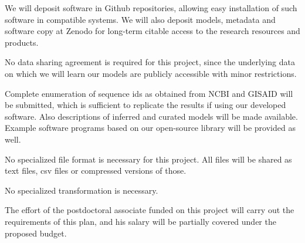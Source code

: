 \documentclass[onecolumn, compsoc,12pt]{IEEEtran}
\begin{document}
              We will deposit software in Github repositories, allowing easy installation of such software in compatible systems. We will also deposit models, metadata and software copy at Zenodo for long-term citable access to the research resources and products.


              No data sharing agreement is required for this project, since the underlying data on which we will learn our models are publicly accessible with minor restrictions.


              Complete enumeration of sequence ids as obtained from NCBI and GISAID will be submitted, which is sufficient to replicate the results if using our developed software. Also descriptions of inferred and curated models will be made available. Example software programs based on our open-source library will be provided as well.


              No specialized file format is necessary for this project. All files will be shared as text files, csv files or compressed versions of those.


              No specialized transformation is necessary.


              The effort of the postdoctoral associate funded on this project will carry out the requirements of this plan, and his salary will be partially covered under the proposed budget.


\clearpage









\clearpage

%
%


\end{document}
